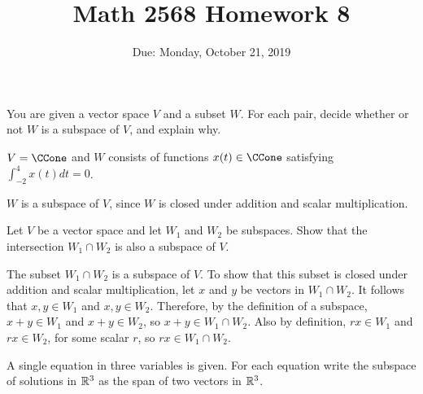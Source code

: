 \documentclass{article}
\title{Math 2568 Homework 8}
\author{\phantom{Dr. Golubitsky}}
\date{Due: Monday, October 21, 2019}
\begin{document}
\maketitle


\problemlabel

\noindent You are given a vector space $V$ and a subset $W$.  For each pair, decide whether or not $W$ is a subspace of $V$, and explain why.

\begin{exercise} \label{c5.1.4g}
$V=\CCone$ and $W$ consists of functions
     $x(t)\in\CCone$ satisfying $\int_{-2}^4x(t)dt =0$.

\begin{solution}
$W$ is a subspace of $V$, since $W$ is closed under
addition and scalar multiplication.

\end{solution}
\end{exercise}





\problemlabel



\begin{exercise} \label{c5.1.6}
Let $V$ be a vector space and let $W_1$ and $W_2$ be subspaces.
Show that the intersection $W_1\cap W_2$ is also a subspace of $V$.

\begin{solution}

The subset $W_1 \cap W_2$ is a subspace of $V$.  To show that this
subset is closed under addition and scalar multiplication, 
let $x$ and $y$ be vectors in $W_1 \cap W_2$.  It follows that
$x,y \in W_1$ and $x,y \in W_2$.  Therefore, by the
definition of a subspace, $x + y \in W_1$ and $x + y \in W_2$, so
$x + y \in W_1 \cap W_2$.  Also by definition, $rx \in W_1$ and
$rx \in W_2$, for some scalar $r$, so $rx \in W_1 \cap W_2$.

\end{solution}
\end{exercise}





\problemlabel

\noindent A single equation in three variables is given.  For each equation write the subspace of solutions in $\mathbb R^3$ as the span of two vectors in $\mathbb R^3$.
\end{document}
